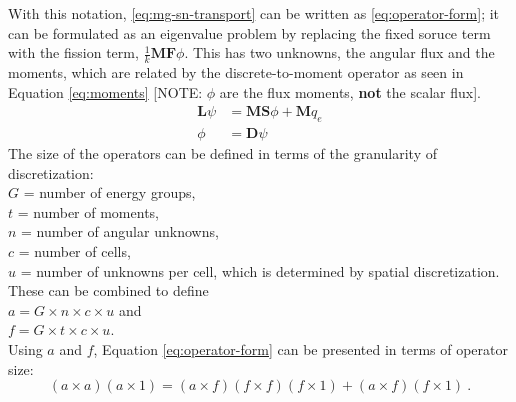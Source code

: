 \documentclass[12pt]{article}
\newcommand{\ve}[1]{\ensuremath{\mathbf{#1}}}
\begin{document}
With this notation, \autoref{eq:mg-sn-transport} can be written as \autoref{eq:operator-form}; it can be formulated as an eigenvalue problem by replacing the fixed soruce term with the fission term, $\frac{1}{k}\mathbf{MF}\phi$. This has two unknowns, the angular flux and the moments, which are related by the discrete-to-moment operator as seen in Equation \eqref{eq:moments} [NOTE: $\phi$ are the flux moments, \textbf{not} the scalar flux].
%
\begin{align}
  \mathbf{L} \psi &= \mathbf{MS}\phi + \ve{M}q_{e} \label{eq:operator-form}\\
  \phi &= \mathbf{D}\psi 
  \label{eq:moments}
\end{align}
%
The size of the operators can be defined in terms of the granularity of discretization: \\
%
\hspace*{2em} $G$ = number of energy groups, \\
\hspace*{2em} $t$ = number of moments, \\
\hspace*{2em} $n$ = number of angular unknowns, \\
\hspace*{2em} $c$ = number of cells, \\
\hspace*{2em} $u$ = number of unknowns per cell, which is determined by spatial discretization. \\
%
These can be combined to define \\
\hspace*{2em} $a = G \times n \times c \times u$ and \\
\hspace*{2em} $f = G \times t \times c \times u$. \\
Using $a$ and $f$, Equation \eqref{eq:operator-form} can be presented in terms of operator size:\\
\[
(a \times a)(a \times 1) = (a \times f) (f \times f) (f \times 1) + (a \times f) (f \times 1)\:.
\]
\end{document}
